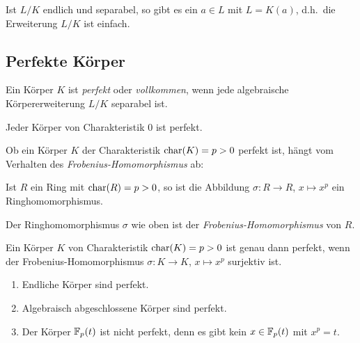 \begin{theorem}
  Ist $L/K$ endlich und separabel, so gibt es ein $a \in L$ mit $L = K(a)$, d.h.\ die Erweiterung $L/K$ ist einfach.
\end{theorem}



\subsection{Perfekte Körper}

\begin{definition}
  Ein Körper $K$ ist \emph{perfekt} oder \emph{vollkommen}, wenn jede algebraische Körpererweiterung $L/K$ separabel ist.
\end{definition}

\begin{example}
  Jeder Körper von Charakteristik $0$ ist perfekt.
\end{example}

Ob ein Körper $K$ der Charakteristik $\operatorname{char}(K) = p > 0$ perfekt ist, hängt vom Verhalten des \emph{Frobenius-Homomorphismus} ab:

\begin{lemma}
  Ist $R$ ein Ring mit $\operatorname{char}(R) = p > 0$, so ist die Abbildung $\sigma \colon R \to R$, $x \mapsto x^p$ ein Ringhomomorphismus.
\end{lemma}

\begin{definition}
  Der Ringhomomorphismus $\sigma$ wie oben ist der \emph{Frobenius-Homo\-mor\-phis\-mus} von $R$.
\end{definition}

\begin{proposition}
  Ein Körper $K$ von Charakteristik $\operatorname{char}(K) = p > 0$ ist genau dann perfekt, wenn der Frobenius-Homomorphismus $\sigma \colon K \to K$, $x \mapsto x^p$ surjektiv ist.
\end{proposition}

\begin{example}
  \begin{enumerate}
    \item
      Endliche Körper sind perfekt.
    \item
      Algebraisch abgeschlossene Körper sind perfekt.
    \item
      Der Körper $\mathbb{F}_p(t)$ ist nicht perfekt, denn es gibt kein $x \in \mathbb{F}_p(t)$ mit $x^p = t$.
  \end{enumerate}
\end{example}




